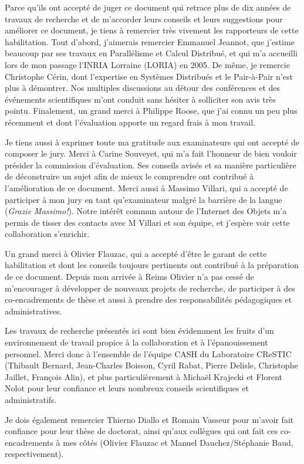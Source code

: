 \documentclass[final,twoside]{hdr} %
\begin{document}
Parce qu'ils ont accepté de juger ce document qui retrace plus de dix années de travaux de recherche et de m'accorder leurs conseils et leurs suggestions pour améliorer ce document, je tiens à remercier très vivement les rapporteurs de cette habilitation. Tout d'abord, j'aimerais remercier Emmanuel Jeannot, que j'estime beaucoup par ses travaux en Parallélisme et Calcul Distribué, et qui m'a accueilli lors de mon passage l'INRIA Lorraine (LORIA) en 2005. De même, je remercie Christophe Cérin, dont l'expertise en Systèmes Distribués et le Pair-à-Pair n'est plus à démontrer. Nos multiples discussions au détour des conférences et des événements scientifiques m'ont conduit sans hésiter à solliciter son avis très pointu. Finalement, un grand merci à Philippe Roose, que j'ai connu un peu plus récemment et dont l'évaluation apporte un regard frais à mon travail.  

  
Je tiens aussi à exprimer toute ma gratitude aux examinateurs qui ont accepté de composer le jury. Merci à Carine Souveyet, qui m'a fait l'honneur de bien vouloir présider la commission d'évaluation. Ses conseils avisés et sa manière particulière de déconstruire un sujet afin de mieux le comprendre ont contribué à l'amélioration de ce document.  Merci aussi à Massimo Villari, qui a accepté de participer à mon jury en tant qu'examinateur malgré la barrière de la langue (\textit{Grazie Massimo!}). Notre intérêt commun autour de l'Internet des Objets m'a permis de tisser des contacts avec M Villari et son équipe, et j'espère voir cette collaboration s'enrichir.

Un grand merci à Olivier Flauzac, qui a accepté d'être le garant de cette habilitation et dont les conseils toujours pertinents ont contribué à la préparation de ce document. Depuis mon arrivée à Reims Olivier n'a pas cessé de m'encourager à développer de nouveaux projets de recherche, de participer à des co-encadrements de thèse et aussi à prendre des responsabilités pédagogiques et administratives.   


Les travaux de recherche présentés ici sont bien évidemment les fruits d'un environnement de travail propice à la collaboration et à l'épanouissement personnel. Merci donc à l'ensemble de l'équipe CASH du Laboratoire CReSTIC (Thibault Bernard, Jean-Charles Boisson, Cyril Rabat, Pierre Delisle, Christophe Jaillet, François Alin), et plus particulièrement à Michaël Krajecki et Florent Nolot pour leur confiance et leurs nombreux conseils scientifiques et administratifs. 

Je dois également remercier Thierno Diallo et Romain Vasseur pour m'avoir fait confiance pour leur thèse de doctorat, ainsi qu'aux collègues qui ont fait ces co-encadrements à mes côtés (Olivier Flauzac et Manuel Dauchez/Stéphanie Baud, respectivement). 
\end{document}
